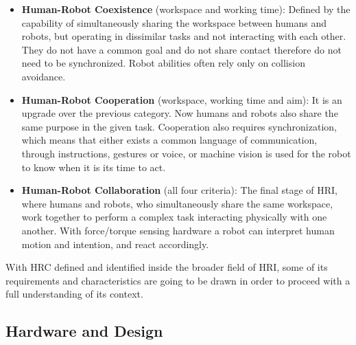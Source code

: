\begin{itemize}
    \item \textbf{Human-Robot Coexistence} (workspace and working time): Defined by the capability of simultaneously sharing the workspace between humans and robots, but operating in dissimilar tasks and not interacting with each other. They do not have a common goal and do not share contact therefore do not need to be synchronized. Robot abilities often rely only on collision avoidance.
    \item \textbf{Human-Robot Cooperation} (workspace, working time and aim): It is an upgrade over the previous category. Now humans and robots also share the same purpose in the given task. Cooperation also requires synchronization, which means that either exists a common language of communication, through instructions, gestures or voice, or machine vision is used for the robot to know when it is its time to act.
    \item \textbf{Human-Robot Collaboration} (all four criteria): The final stage of HRI, where humans and robots, who simultaneously share the same workspace, work together to perform a complex task interacting physically with one another. With force/torque sensing hardware a robot can interpret human motion and intention, and react accordingly. 
\end{itemize}


\par With HRC defined and identified inside the broader field of HRI, some of its requirements and characteristics are going to be drawn in order to proceed with a full understanding of its context.


\subsection{Hardware and Design}

